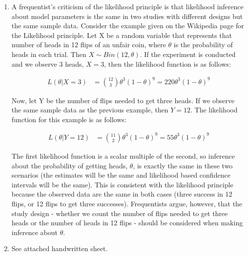 \documentclass[12pt]{article}\usepackage[]{graphicx}\usepackage[]{color}
\begin{document}
\begin{doublespacing}
\begin{enumerate}
\item A frequentist's criticism of the likelihood principle is that likelihood inference about model parameters is the same in two studies with different designs but the same sample data. Consider the example given on the Wikipedia page for the Likelihood principle. Let X be a random variable that represents that number of heads in 12 flips of an unfair coin, where $\theta$ is the probability of heads in each trial. Then $X \sim Bin(12, \theta)$. If the experiment is conducted and we observe 3 heads, $X=3$, then the likelihood function is as follows:

\begin{align*}
L(\theta|X=3) &= {12 \choose 3}\theta^3(1-\theta)^9=220 \theta^3 (1-\theta)^9
\end{align*}

Now, let Y be the number of flips needed to get three heads. If we observe the same sample data as the previous example, then $Y=12$. The likelihood function for this example is as follows:

\begin{align*}
L(\theta|Y=12) &= {11 \choose 2}\theta^3(1-\theta)^9=55 \theta^3 (1-\theta)^9
\end{align*}

The first likelihood function is a scalar multiple of the second, so inference about the probability of getting heads, $\theta$, is exactly the same in these two scenarios (the estimates will be the same and likelihood based confidence intervals will be the same). This is consistent with the likelihood principle because the observed data are the same in both cases (three success in 12 flips, or 12 flips to get three successes). Frequentists argue, however, that the study design - whether we count the number of flips needed to get three heads or the number of heads in 12 flips - should be considered when making inference about $\theta$.

\item See attached handwritten sheet.


\end{enumerate}
\end{doublespacing}
\end{document}
